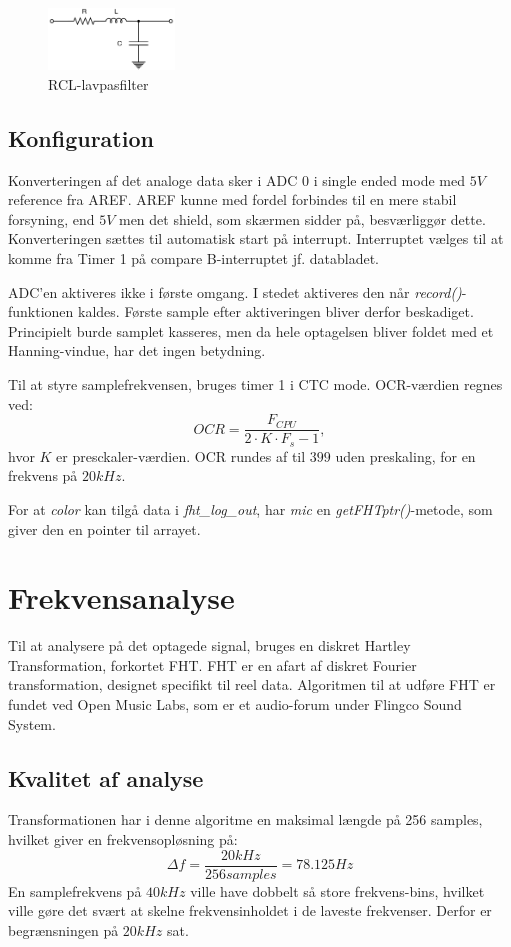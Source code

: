 \begin{figure}[H]
	\center
	\includegraphics[width=0.3\textwidth]{Figur/RCL_diagram.pdf}
	\caption{RCL-lavpasfilter}
	\label{fig:RCL}
\end{figure}

\subsection{Konfiguration}
Konverteringen af det analoge data sker i ADC 0 i single ended mode med $5 V$ reference fra AREF. 
AREF kunne med fordel forbindes til en mere stabil forsyning, end $5 V$ men det shield, som skærmen sidder på, besværliggør dette. 
Konverteringen sættes til automatisk start på interrupt. 
Interruptet vælges til at komme fra Timer 1 på compare B-interruptet jf. databladet.

ADC'en aktiveres ikke i første omgang. 
I stedet aktiveres den når \textit{record()}-funktionen kaldes. 
Første sample efter aktiveringen bliver derfor beskadiget.
Principielt burde samplet kasseres, men da hele optagelsen bliver foldet med et Hanning-vindue, har det ingen betydning. 

Til at styre samplefrekvensen, bruges timer 1 i CTC mode. 
OCR-værdien regnes ved: $$ OCR = \frac{F_{CPU}}{2 \cdot K \cdot F_s - 1}, $$ hvor $K$ er presckaler-værdien.
OCR rundes af til $399 $ uden preskaling, for en frekvens på $20 kHz$. 

For at \textit{color} kan tilgå data i \textit{fht\_log\_out}, har \textit{mic} en \textit{getFHTptr()}-metode, som giver den en pointer til arrayet. 

\section{Frekvensanalyse}
Til at analysere på det optagede signal, bruges en diskret Hartley Transformation, forkortet FHT. 
FHT er en afart af diskret Fourier transformation, designet specifikt til reel data. 
Algoritmen til at udføre FHT er fundet ved Open Music Labs, som er et audio-forum under Flingco Sound System. %

\subsection{Kvalitet af analyse}
Transformationen har i denne algoritme en maksimal længde på 256 samples, hvilket giver en frekvensopløsning på: $$ \Delta f = \frac{20 kHz}{256 samples} = 78.125 Hz$$ 
En samplefrekvens på $ 40 kHz$ ville have dobbelt så store frekvens-bins, hvilket ville gøre det svært at skelne frekvensinholdet i de laveste frekvenser. 
Derfor er begrænsningen på $20 kHz $ sat. 

